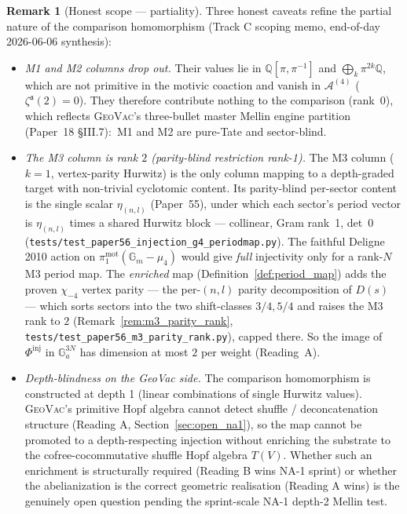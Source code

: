 \documentclass[11pt,a4paper]{article}
\theoremstyle{plain}
\theoremstyle{definition}
\newtheorem{remark}[theorem]{Remark}
\newcommand{\Ga}{\mathbb{G}_{a}}
\newcommand{\Gm}{\mathbb{G}_{m}}
\newcommand{\Q}{\mathbb{Q}}
\begin{document}
\begin{remark}[Honest scope --- partiality]\label{rem:injection_honest_scope}
Three honest caveats refine the partial nature of the comparison
homomorphism (Track C scoping memo, end-of-day 2026-06-06 synthesis):
\begin{itemize}
\item \emph{M1 and M2 columns drop out.} Their values lie in
$\Q[\pi, \pi^{-1}]$ and $\bigoplus_{k} \pi^{2k}\Q$, which are not primitive
in the motivic coaction and vanish in $\mathcal{A}^{(4)}$
($\zeta^{\mathfrak{a}}(2) = 0$). They therefore contribute nothing to the
comparison (rank~$0$), which reflects \textsc{GeoVac}'s three-bullet master
Mellin engine partition (Paper~18 \S III.7):\ M1 and M2 are pure-Tate and
sector-blind.
\item \emph{The M3 column is rank $2$ (parity-blind restriction rank-1).}
The M3 column ($k = 1$, vertex-parity Hurwitz) is the only column
mapping to a depth-graded target with non-trivial cyclotomic content.
Its parity-blind per-sector content is the single scalar
$\eta_{(n,l)}$ (Paper~55), under which each sector's period vector is
$\eta_{(n,l)}$ times a shared Hurwitz block --- collinear, Gram rank~1,
det~0 (\texttt{tests/test\_paper56\_injection\_g4\_periodmap.py}). The
faithful Deligne 2010 action on
$\pi_{1}^{\mathrm{mot}}(\Gm - \mu_{4})$ would give \emph{full}
injectivity only for a rank-$N$ M3 period map. The \emph{enriched} map
(Definition~\ref{def:period_map}) adds the proven $\chi_{-4}$ vertex
parity --- the per-$(n,l)$ parity decomposition of $D(s)$ --- which
sorts sectors into the two shift-classes $3/4, 5/4$ and raises the M3
rank to $2$ (Remark~\ref{rem:m3_parity_rank},
\texttt{tests/test\_paper56\_m3\_parity\_rank.py}), capped there. So the
image of $\Phi^{\mathrm{inj}}$ in $\Ga^{3N}$ has dimension at most $2$ per
weight (Reading~A).
\item \emph{Depth-blindness on the GeoVac side.} The comparison
homomorphism is constructed at depth 1 (linear combinations of single Hurwitz
values). \textsc{GeoVac}'s primitive Hopf algebra cannot detect
shuffle / deconcatenation structure (Reading A,
Section~\ref{sec:open_na1}), so the map cannot be promoted to a
depth-respecting injection without enriching the substrate to the
cofree-cocommutative shuffle Hopf algebra $T(V)$. Whether such an
enrichment is structurally required (Reading B wins NA-1 sprint)
or whether the abelianization is the correct geometric realisation
(Reading A wins) is the genuinely open question pending the
sprint-scale NA-1 depth-2 Mellin test.
\end{itemize}
\end{remark}
\end{document}
